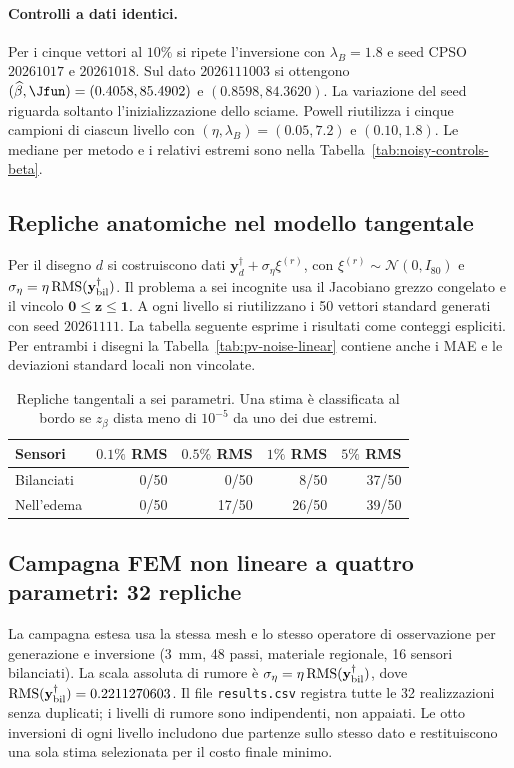 \paragraph{Controlli a dati identici.}\label{app:noise-controls}
Per i cinque vettori al $10\%$ si ripete l'inversione con $\lambda_B=1.8$ e seed CPSO $20261017$ e $20261018$. Sul dato $2026111003$ si ottengono $(\widehat\beta,\Jfun)=(0.4058,85.4902)$ e $(0.8598,84.3620)$. La variazione del seed riguarda soltanto l'inizializzazione dello sciame. Powell riutilizza i cinque campioni di ciascun livello con $(\eta,\lambda_B)=(0.05,7.2)$ e $(0.10,1.8)$. Le mediane per metodo e i relativi estremi sono nella Tabella~\ref{tab:noisy-controls-beta}.

\subsection{Repliche anatomiche nel modello tangentale}
Per il disegno $d$ si costruiscono dati $\mathbf y_d^\dagger+\sigma_\eta\xi^{(r)}$, con $\xi^{(r)}\sim\mathcal N(0,I_{80})$ e $\sigma_\eta=\eta\,\mathrm{RMS}(\mathbf y^\dagger_{\rm bil})$. Il problema a sei incognite usa il Jacobiano grezzo congelato e il vincolo $\mathbf0\leq\mathbf z\leq\mathbf1$. A ogni livello si riutilizzano i 50 vettori standard generati con seed $20261111$. La tabella seguente esprime i risultati come conteggi espliciti. Per entrambi i disegni la Tabella~\ref{tab:pv-noise-linear} contiene anche i MAE e le deviazioni standard locali non vincolate.

\begin{table}[!htbp]\centering\small
\caption{Repliche tangentali a sei parametri. Una stima è classificata al bordo se $z_\beta$ dista meno di $10^{-5}$ da uno dei due estremi.}
\label{tab:app-tangent-counts}
\begin{tabular}{@{}lrrrr@{}}\toprule
Sensori & $0.1\%$ RMS & $0.5\%$ RMS & $1\%$ RMS & $5\%$ RMS\\\midrule
Bilanciati & 0/50 & 0/50 & 8/50 & 37/50\\
Nell'edema & 0/50 & 17/50 & 26/50 & 39/50\\\bottomrule
\end{tabular}
\end{table}

\subsection{Campagna FEM non lineare a quattro parametri: 32 repliche}
\label{app:noise-fem-complete}
La campagna estesa usa la stessa mesh e lo stesso operatore di osservazione per generazione e inversione ($3$~mm, 48 passi, materiale regionale, 16 sensori bilanciati). La scala assoluta di rumore è $\sigma_{\eta}=\eta\,\mathrm{RMS}(\mathbf y_{\rm bil}^\dagger)$, dove $\mathrm{RMS}(\mathbf y_{\rm bil}^\dagger)=0.2211270603$. Il file \texttt{results.csv} registra tutte le 32 realizzazioni senza duplicati; i livelli di rumore sono indipendenti, non appaiati. Le otto inversioni di ogni livello includono due partenze sullo stesso dato e restituiscono una sola stima selezionata per il costo finale minimo.

